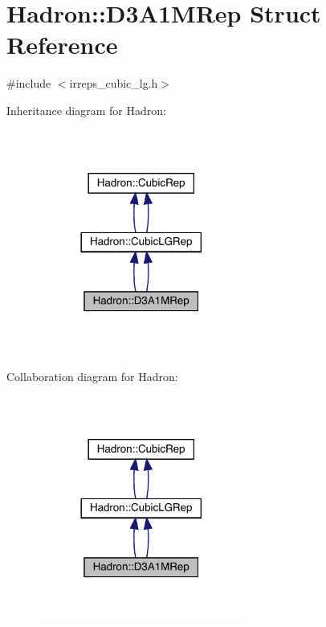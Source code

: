 \hypertarget{structHadron_1_1D3A1MRep}{}\section{Hadron\+:\+:D3\+A1\+M\+Rep Struct Reference}
\label{structHadron_1_1D3A1MRep}


{\ttfamily \#include $<$irreps\+\_\+cubic\+\_\+lg.\+h$>$}



Inheritance diagram for Hadron\+:\nopagebreak
\begin{figure}[H]
\begin{center}
\leavevmode
\includegraphics[width=192pt]{d9/d5f/structHadron_1_1D3A1MRep__inherit__graph}
\end{center}
\end{figure}


Collaboration diagram for Hadron\+:\nopagebreak
\begin{figure}[H]
\begin{center}
\leavevmode
\includegraphics[width=192pt]{d3/daf/structHadron_1_1D3A1MRep__coll__graph}
\end{center}
\end{figure}
